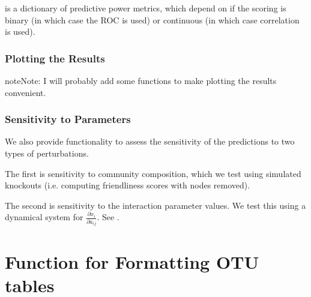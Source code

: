 \documentclass[letterpaper,10pt,english]{sphinxmanual}
\begin{document}
\sphinxAtStartPar
{} is a dictionary of predictive power metrics, which depend on if the scoring is binary (in which case the ROC is used) or continuous (in which case correlation is used).


\subsection{Plotting the Results}
\label{\detokenize{usage:plotting-the-results}}
\begin{sphinxadmonition}{note}{Note:}
\sphinxAtStartPar
I will probably add some functions to make plotting the results convenient.
\end{sphinxadmonition}


\subsection{Sensitivity to Parameters}
\label{\detokenize{usage:sensitivity-to-parameters}}
\sphinxAtStartPar
We also provide functionality to assess the sensitivity of the predictions to two types of perturbations.

\sphinxAtStartPar
The first is sensitivity to community composition, which we test using simulated knock\sphinxhyphen{}outs (i.e. computing friendliness scores with nodes removed).

\sphinxAtStartPar
The second is sensitivity to the interaction parameter values. We test this using a dynamical system for \(\frac{\partial x_i}{\partial a_{ij}}\). See {\hyperref[\detokenize{sensit::doc}]{}}.

\sphinxstepscope


\chapter{Function for Formatting OTU tables}
\label{\detokenize{format:function-for-formatting-otu-tables}}\label{\detokenize{format::doc}}
\end{document}

